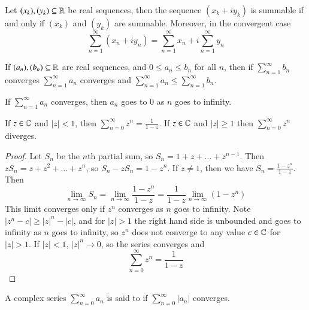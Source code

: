 \begin{theorem}
    Let $(x_k),(y_k) \subseteq \mathbb R$ be real sequences, then the sequence $(x_k+iy_k)$ is summable if and only if $(x_k)$ and $(y_k)$ are summable. Moreover, in the convergent case \begin{equation*}
        \sum_{n=1}^{\infty}(x_n+iy_n) = \sum_{n=1}^{\infty}x_n+i\sum_{n=1}^{\infty}y_n
    \end{equation*}
\end{theorem}


\begin{theorem}
    If $(a_n),(b_n) \subseteq \mathbb R$ are real sequences, and $0 \leq a_n \leq b_n$ for all $n$, then if $\sum_{n=1}^{\infty}b_n$ converges $\sum_{n=1}^{\infty}a_n$ converges and $\sum_{n=1}^{\infty}a_n \leq \sum_{n=1}^{\infty}b_n$.
\end{theorem}


\begin{theorem}
    If $\sum_{n=1}^{\infty}a_n$ converges, then $a_n$ goes to $0$ as $n$ goes to infinity.
\end{theorem}


\begin{proposition}
    If $z \in \mathbb C$ and $|z| < 1$, then $\sum_{n=0}^{\infty}z^n = \frac{1}{1-z}$. If $z \in \mathbb C$ and $|z| \geq 1$ then $\sum_{n=0}^{\infty}z^n$ diverges.
\end{proposition}
\begin{proof}
    Let $S_n$ be the $n$th partial sum, so $S_n = 1+z+...+z^{n-1}$. Then $zS_n = z+z^2+...+z^n$, so $S_n-zS_n = 1-z^n$. If $z \neq 1$, then we have $S_n = \frac{1-z^n}{1-z}$. Then \begin{equation*}
        \lim\limits_{n\rightarrow \infty}S_n = \lim\limits_{n\rightarrow \infty}\frac{1-z^n}{1-z} = \frac{1}{1-z}\lim\limits_{n\rightarrow \infty}(1-z^n)
    \end{equation*}
    This limit converges only if $z^n$ converges as $n$ goes to infinity. Note $|z^n-c| \geq |z|^n-|c|$, and for $|z| > 1$ the right hand side is unbounded and goes to infinity as $n$ goes to infinity, so $z^n$ does not converge to any value $c \in \mathbb C$ for $|z| > 1$. If $|z| < 1$, $|z|^n\rightarrow 0$, so the series converges and \begin{equation*}
        \sum_{n=0}^{\infty}z^n = \frac{1}{1-z}
    \end{equation*}
\end{proof}

\begin{definition}
    A complex series $\sum_{n=0}^{\infty}a_n$ is said to  if $\sum_{n=0}^{\infty}|a_n|$ converges.
\end{definition}

